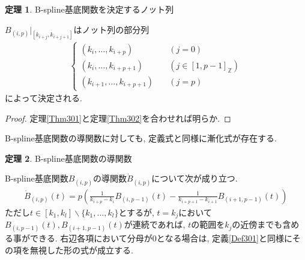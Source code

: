 \documentclass{jsarticle}
\newcommand\pare[1]{(#1)}
\newcommand\Pare[1]{\left(#1\right)}
\newcommand\squa[1]{[#1]}
\newcommand\Z[2]{\squa{#1,#2}_\mathbb{Z}}
\theoremstyle{definition}%
\newtheorem{thm}{定理}
\begin{document}
\newpage
\begin{screen}
	\begin{thm}
		\label{Thm303}
		B-spline基底関数を決定するノット列

		$B_{(i,p)}|_{[k_{i+j},k_{i+j+1}]}$はノット列の部分列
		\begin{align}
			\begin{cases}
				\pare{k_{i}, \dots ,k_{i+p}} \quad & (j=0) \\
				\pare{k_{i}, \dots ,k_{i+p+1}} \quad & (j\in\Z{1}{p-1}) \\
				\pare{k_{i+1}, \dots ,k_{i+p+1}} \quad & (j=p)
			\end{cases}
		\end{align}によって決定される.
	\end{thm}
\end{screen}
\begin{proof}
	定理\ref{Thm301}と定理\ref{Thm302}を合わせれば明らか.
\end{proof}
B-spline基底関数の導関数に対しても, 定義式と同様に漸化式が存在する.
\begin{screen}
	\begin{thm}
		\label{Thm304}
		B-spline基底関数の導関数

        B-spline基底関数$B_{(i,p)}$の導関数$\dot{B}_{(i,p)}$について次が成り立つ.
		\begin{align}
			\label{Eqn304}
			\dot{B}_{(i,p)}(t)=p\Pare{\frac{1}{k_{i+p}-k_{i}}B_{(i,p-1)}(t)-\frac{1}{k_{i+p+1}-k_{i+1}}B_{(i+1,p-1)}(t)}
		\end{align}
		ただし$t\in[k_1, k_l]\backslash \{k_1,\dots,k_l\}$とするが, $t=k_j$において$B_{(i,p-1)}(t), B_{(i+1,p-1)}(t)$が連続であれば, $t$の範囲を$k_j$の近傍までも含める事ができる.
		右辺各項において分母が$0$となる場合は, 定義\ref{Def301}と同様にその項を無視した形の式が成立する.
	\end{thm}
\end{screen}
\end{document}

